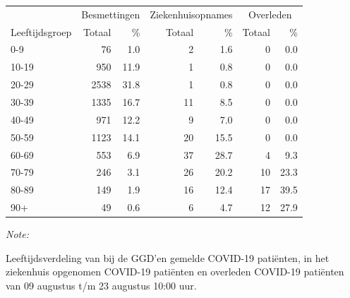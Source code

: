 \documentclass[
  english,
  man,floatsintext]{apa6}
\begin{document}
\begin{table}[H]
\centering\begingroup\fontsize{11}{13}\selectfont

\begin{threeparttable}
\begin{tabular}{lrrrrrr}
\toprule
\multicolumn{1}{c}{ } & \multicolumn{2}{c}{Besmettingen} & \multicolumn{2}{c}{Ziekenhuisopnames} & \multicolumn{2}{c}{Overleden} \\
\cmidrule(l{3pt}r{3pt}){2-3} \cmidrule(l{3pt}r{3pt}){4-5} \cmidrule(l{3pt}r{3pt}){6-7}
Leeftijdsgroep & Totaal & \% & Totaal & \% & Totaal & \%\\
\midrule
0-9 & 76 & 1.0 & 2 & 1.6 & 0 & 0.0\\
10-19 & 950 & 11.9 & 1 & 0.8 & 0 & 0.0\\
20-29 & 2538 & 31.8 & 1 & 0.8 & 0 & 0.0\\
30-39 & 1335 & 16.7 & 11 & 8.5 & 0 & 0.0\\
40-49 & 971 & 12.2 & 9 & 7.0 & 0 & 0.0\\
50-59 & 1123 & 14.1 & 20 & 15.5 & 0 & 0.0\\
60-69 & 553 & 6.9 & 37 & 28.7 & 4 & 9.3\\
70-79 & 246 & 3.1 & 26 & 20.2 & 10 & 23.3\\
80-89 & 149 & 1.9 & 16 & 12.4 & 17 & 39.5\\
90+ & 49 & 0.6 & 6 & 4.7 & 12 & 27.9\\
\bottomrule
\end{tabular}
\begin{tablenotes}
\item \textit{Note: } 
\item Leeftijdsverdeling van bij de GGD’en gemelde COVID-19 patiënten, in het ziekenhuis opgenomen COVID-19 patiënten en overleden COVID-19 patiënten van 09 augustus t/m 23 augustus 10:00 uur.
\end{tablenotes}
\end{threeparttable}
\endgroup{}
\end{table}
\end{document}

